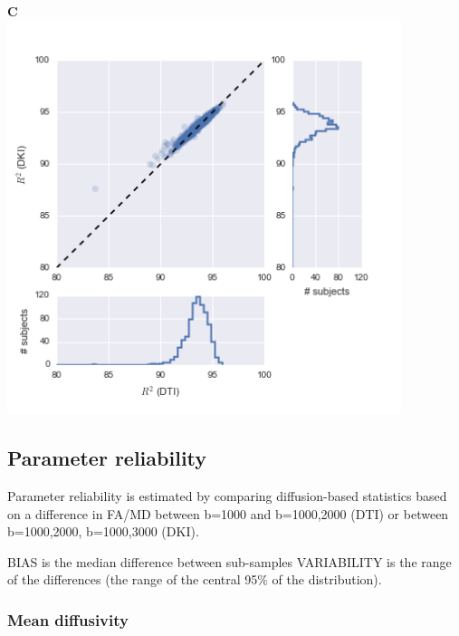 \documentclass[a0, landscape]{a0poster}
\begin{document}
\begin{multicols}{3}
\begin{minipage}[b]{1\linewidth}
\begin{minipage}[b]{0.33\linewidth}
  \end{minipage}
  \begin{minipage}[b]{0.33\linewidth}
  \textbf{C}\\
  \includegraphics[width=11.5cm]{dti_1000_dki.png}
  \end{minipage}
\end{minipage}

\subsection*{Parameter reliability}

\noindent Parameter reliability is estimated by comparing diffusion-based
statistics based on a difference in FA/MD between b=1000 and b=1000,2000 (DTI)
or between b=1000,2000, b=1000,3000 (DKI).

\noindent BIAS is the median difference between sub-samples VARIABILITY is the
range of the differences (the range of the central 95\% of the distribution).

\subsubsection*{Mean diffusivity}


\end{multicols}
\end{document}
